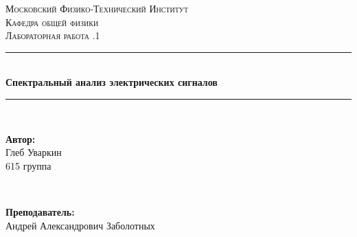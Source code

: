 \documentclass[a4paper, 12pt,twoside]{article}
\begin{document}
\begin{titlepage}

\newcommand{\HRule}{\rule{\linewidth}{0.7mm}} %

\center %
 

\textsc{\LARGE Московский Физико-Технический Институт}\\[1,5cm] %
\textsc{\Large Кафедра общей физики}\\[0.5cm] %
\textsc{\large Лабораторная работа .1}\\[0.5cm] %


\HRule
\\[0.4cm]
{ \huge \bfseries Спектральный анализ электрических сигналов}
\\[0.2cm] %
\HRule
\\[1.5cm]


 

\begin{minipage}{0.4\textwidth}
	\begin{flushleft} \large
		\textbf{Автор:}\\
		Глеб Уваркин \\
		615 группа
	\end{flushleft}
\end{minipage}
~
\begin{minipage}{0.4\textwidth}
	\begin{flushright} \large
		\textbf {Преподаватель:} \\
		Андрей Александрович Заболотных %
	\end{flushright}
\end{minipage}


\end{titlepage}
\end{document}

